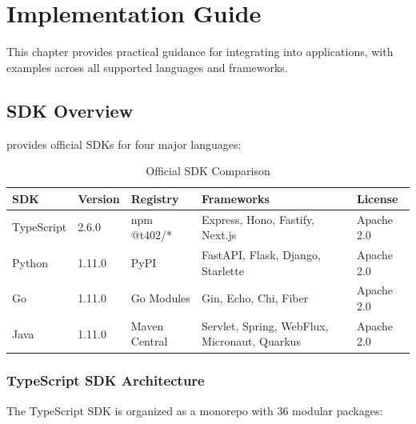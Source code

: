 \chapter{Implementation Guide}
\label{ch:implementation}

This chapter provides practical guidance for integrating \tprotocol{} into applications, with examples across all supported languages and frameworks.

\section{SDK Overview}
\label{sec:sdk-overview}

\tprotocol{} provides official SDKs for four major languages:

\begin{table}[htbp]
\centering
\caption{Official SDK Comparison}
\label{tab:sdk-comparison}
\footnotesize
\begin{tabular}{l l l l l}
\toprule
\textbf{SDK} & \textbf{Version} & \textbf{Registry} & \textbf{Frameworks} & \textbf{License} \\
\midrule
TypeScript & 2.6.0 & npm @t402/* & Express, Hono, Fastify, Next.js & Apache 2.0 \\
Python & 1.11.0 & PyPI & FastAPI, Flask, Django, Starlette & Apache 2.0 \\
Go & 1.11.0 & Go Modules & Gin, Echo, Chi, Fiber & Apache 2.0 \\
Java & 1.11.0 & Maven Central & Servlet, Spring, WebFlux, Micronaut, Quarkus & Apache 2.0 \\
\bottomrule
\end{tabular}
\end{table}

\subsection{TypeScript SDK Architecture}

The TypeScript SDK is organized as a monorepo with 36 modular packages:

